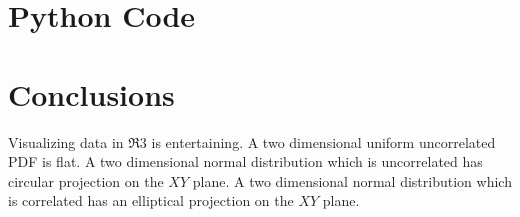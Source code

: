 \section{Python Code} 



\section{Conclusions} 
Visualizing data in $\Re3$ is entertaining. A two dimensional uniform uncorrelated PDF is flat. A two dimensional normal distribution which is uncorrelated has circular projection on the $XY$ plane. A two dimensional normal distribution which is correlated has an elliptical projection on the $XY$ plane.  

